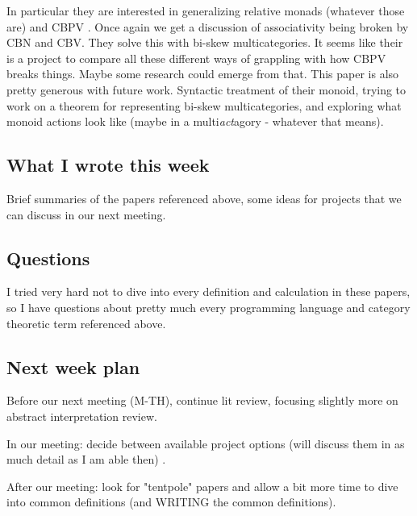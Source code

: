 \documentclass{amsart}
\begin{document}
\begin{itemize}
In particular they are interested in generalizing relative monads (whatever those are) and CBPV . 
Once again we get a discussion of associativity being broken by CBN and CBV.
They solve this with bi-skew multicategories.
It seems like their is a project to compare all these different ways of grappling with how CBPV breaks things. Maybe some research could emerge from that.
This paper is also pretty generous with future work. 
Syntactic treatment of their monoid, trying to work on a theorem for representing bi-skew multicategories, and exploring what monoid actions look like (maybe in a multi\emph{act}agory - whatever that means).

\end{itemize}

\subsection{What I wrote this week}
Brief summaries of the papers referenced above, some ideas for projects that we can discuss in our next meeting.

\subsection{Questions}
I tried very hard not to dive into every definition and calculation in these papers, so I have questions about pretty much every programming language and category theoretic term referenced above.

\subsection{Next week plan}
Before our next meeting (M-TH), continue lit review, focusing slightly more on abstract interpretation review.

In our meeting: decide between available project options (will discuss them in as much detail as I am able then) .

After our meeting: look for "tentpole" papers and allow a bit more time to dive into common definitions (and WRITING the common definitions).

\printbibliography[]
\end{document}
